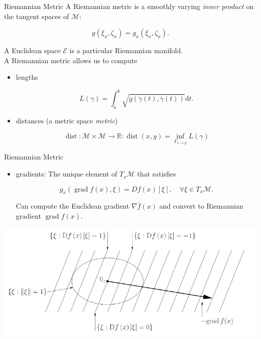 \documentclass[xcolor=dvipsnames,t]{beamer} %
\newcommand{\reals}{\mathbb{R}}
\newcommand{\drm}{\mathrm{d}}
\begin{document}
\begin{frame}{Riemannian Metric}
   A Riemannian metric is a smoothly varying \emph{inner product} on the tangent spaces of $\mathcal{M}$:
   
   \[ g(\xi_x,\zeta_x) = g_x(\xi_x,\zeta_x). \] 

   A Euclidean space $\mathcal{E}$ is a particular Riemannian manifold.\\

   A Riemannian metric allows us to compute
   \begin{itemize}
      \item lengths

         \[ L(\gamma) = \int_a^b \sqrt{g(\dot{\gamma}(t),\dot{\gamma}(t))}\drm t. \] 

      \item distances (a metric space \emph{metric})
         
         \[ \operatorname{dist}:\mathcal{M}\times\mathcal{M}\to\reals:\operatorname{dist}(x,y)=\inf_{\Gamma_{x\to y}} L(\gamma) \] 
   \end{itemize}
\end{frame}

\begin{frame}{Riemannian Metric}
   \begin{itemize}
      \item gradients: The unique element of $T_x\mathcal{M}$ that satisfies

         \[ g_x(\operatorname{grad}f(x),\xi) = Df(x)[\xi], \quad \forall \xi\in T_x\mathcal{M}. \] 

         \noindent Can compute the Euclidean gradient $\nabla \bar{f}(x)$ and convert to Riemannian gradient $\operatorname{grad}f(x)$.

   \end{itemize}

   \begin{center}
      \includegraphics[width=\textwidth]{figures/gradient.pdf}
   \end{center}
\end{frame}
\end{document}
